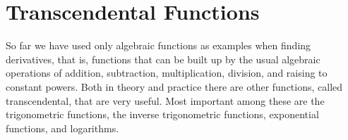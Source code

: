 \chapter{Transcendental Functions}

So far we have used only algebraic functions as examples when finding
derivatives, that is, functions that can be built up by the usual
algebraic operations of addition, subtraction, multiplication,
division, and raising to constant powers. Both in theory and practice
there are other functions, called transcendental, that are very useful. Most important among these are the
trigonometric functions, the inverse trigonometric functions,
exponential functions, and logarithms. 












